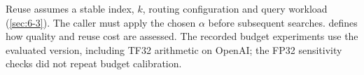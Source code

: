 Reuse assumes a stable index, $k$, routing configuration and query
workload (\cref{sec:6-3}). The caller must apply the chosen $\alpha$
before subsequent searches.  defines how quality and
reuse cost are assessed. The recorded budget experiments use the evaluated version,
including TF32 arithmetic on OpenAI; the FP32 sensitivity checks did
not repeat budget calibration.
